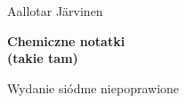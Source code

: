 

\thispagestyle{empty}
{\noindent\fontsize{18pt}{18pt}\selectfont Aallotar Järvinen}

\noindent\makebox[\linewidth]{\rule{\textwidth}{1pt}}

\vspace{10mm}

{\noindent\fontsize{24pt}{24pt}\selectfont \textbf{Chemiczne notatki\\(takie tam)}}
\vspace{10mm}

{\noindent\fontsize{14pt}{14pt}\selectfont Wydanie siódme niepoprawione}

\newpage


